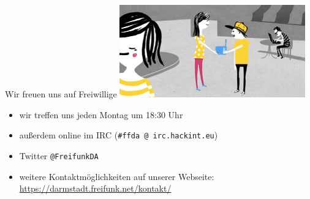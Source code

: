 \documentclass[10pt]{beamer}
\begin{document}
  \begin{frame}{Wir freuen uns auf Freiwillige}
    \hspace{1em}\includegraphics[width=0.6\textwidth]{images/router}
    \begin{itemize}
      \item wir treffen uns jeden Montag um 18:30 Uhr
      \item außerdem online im IRC (\texttt{\#ffda @ irc.hackint.eu})
      \item Twitter \texttt{@FreifunkDA}
      \item weitere Kontaktmöglichkeiten auf unserer Webseite:\\
      \url{https://darmstadt.freifunk.net/kontakt/}
    \end{itemize}
  \end{frame}
\end{document}
